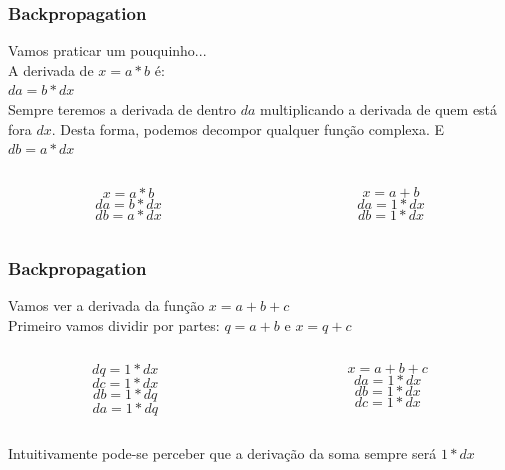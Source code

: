 \documentclass{beamer}
\begin{document}
\begin{frame}
	\frametitle{Backpropagation}
	\begin{example}
		Vamos praticar um pouquinho... \\
		A derivada de $x = a * b$ é: \\
		$da = b * dx$ \\
		Sempre teremos a derivada de dentro \alert{$da $} multiplicando a derivada de quem está fora \alert{$dx$}. Desta forma, podemos decompor qualquer função complexa. E $db = a * dx$
		\begin{columns}
			\begin{column}{0.35\textwidth}
				 $$x = a * b$$ 
				$$da = b * dx$$ 
				$$db = a * dx$$ 
			\end{column}
			\begin{column}{0.35\textwidth}
				$$x = a + b$$ 
				$$da = 1 * dx$$ 
				$$db = 1 * dx$$ 
			\end{column}
		\end{columns}
	\end{example}
\end{frame}
\begin{frame}
	\frametitle{Backpropagation}
	\begin{example}
		Vamos ver a derivada da função $x = a + b + c$ \\
		Primeiro vamos dividir por partes: 
		$q = a+b$ e  $x = q+c$ 
		\begin{columns}
			\begin{column}{0.35\textwidth}
				$$dq = 1 * dx$$
				$$dc = 1 * dx$$
				$$db = 1 * dq$$
				$$da = 1 * dq$$
			\end{column}
			\begin{column}{0.35\textwidth}
				$$x = a + b + c$$ 
				$$da = 1 * dx$$ 
				$$db = 1 * dx$$
				$$dc = 1 * dx$$ 
			\end{column}
		\end{columns}
		Intuitivamente pode-se perceber que a derivação da soma sempre será $1 * dx$
	\end{example}
\end{frame}
\end{document}

